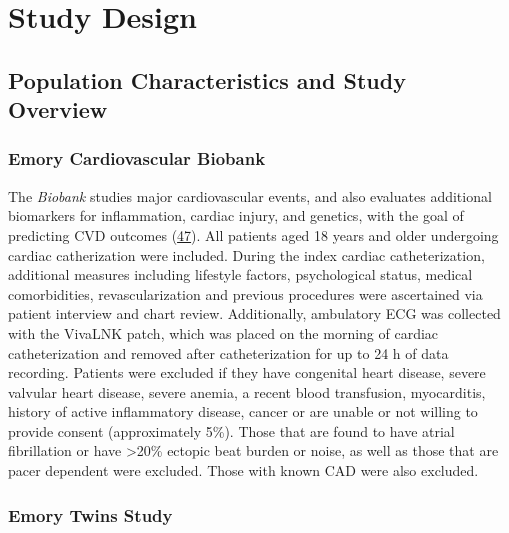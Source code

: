 \documentclass[
  11pt,
  openany]{book}
\begin{document}
\hypertarget{study-design}{%
\chapter{Study Design}\label{study-design}}

\hypertarget{population-characteristics-and-study-overview}{%
\section{Population Characteristics and Study Overview}\label{population-characteristics-and-study-overview}}

\hypertarget{emory-cardiovascular-biobank}{%
\subsection{Emory Cardiovascular Biobank}\label{emory-cardiovascular-biobank}}

The \emph{Biobank} studies major cardiovascular events, and also evaluates additional biomarkers for inflammation, cardiac injury, and genetics, with the goal of predicting CVD outcomes (\protect\hyperlink{ref-Ko2017}{47}).
All patients aged 18 years and older undergoing cardiac catherization were included.
During the index cardiac catheterization, additional measures including lifestyle factors, psychological status, medical comorbidities, revascularization and previous procedures were ascertained via patient interview and chart review.
Additionally, ambulatory ECG was collected with the VivaLNK patch, which was placed on the morning of cardiac catheterization and removed after catheterization for up to 24 h of data recording.
Patients were excluded if they have congenital heart disease, severe valvular heart disease, severe anemia, a recent blood transfusion, myocarditis, history of active inflammatory disease, cancer or are unable or not willing to provide consent (approximately 5\%).
Those that are found to have atrial fibrillation or have \textgreater20\% ectopic beat burden or noise, as well as those that are pacer dependent were excluded.
Those with known CAD were also excluded.

\hypertarget{emory-twins-study}{%
\subsection{Emory Twins Study}\label{emory-twins-study}}
\end{document}
